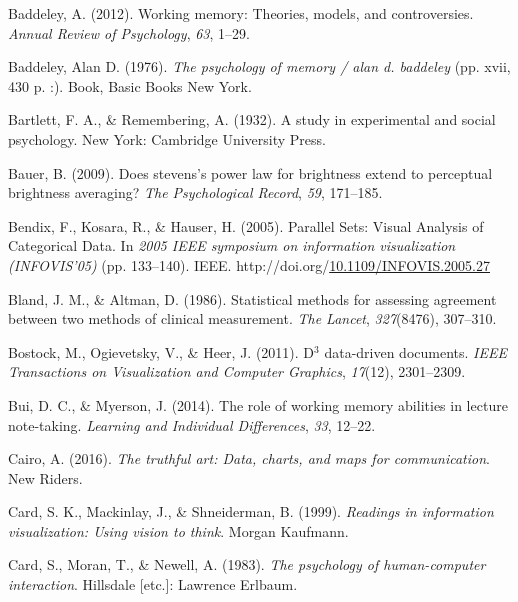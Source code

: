 \documentclass[print]{nuthesis}
\newlength{\cslhangindent}
\newenvironment{CSLReferences}[2]%
{\setlength{\parindent}{0pt}%
\everypar{\setlength{\hangindent}{\cslhangindent}}\ignorespaces}%
{\par}
\begin{document}
\begin{CSLReferences}{1}{0}
\leavevmode{}%
Baddeley, A. (2012). Working memory: Theories, models, and controversies. \emph{Annual Review of Psychology}, \emph{63}, 1--29.

\leavevmode{}%
Baddeley, Alan D. (1976). \emph{The psychology of memory / alan d. baddeley} (pp. xvii, 430 p. :). Book, Basic Books New York.

\leavevmode{}%
Bartlett, F. A., \& Remembering, A. (1932). A study in experimental and social psychology. New York: Cambridge University Press.

\leavevmode{}%
Bauer, B. (2009). Does stevens's power law for brightness extend to perceptual brightness averaging? \emph{The Psychological Record}, \emph{59}, 171--185.

\leavevmode{}%
Bendix, F., Kosara, R., \& Hauser, H. (2005). {Parallel Sets: Visual Analysis of Categorical Data}. In \emph{2005 IEEE symposium on information visualization (INFOVIS'05)} (pp. 133--140). IEEE. http://doi.org/\href{https://doi.org/10.1109/INFOVIS.2005.27}{10.1109/INFOVIS.2005.27}

\leavevmode{}%
Bland, J. M., \& Altman, D. (1986). Statistical methods for assessing agreement between two methods of clinical measurement. \emph{The Lancet}, \emph{327}(8476), 307--310.

\leavevmode{}%
Bostock, M., Ogievetsky, V., \& Heer, J. (2011). D\(^3\) data-driven documents. \emph{IEEE Transactions on Visualization and Computer Graphics}, \emph{17}(12), 2301--2309.

\leavevmode{}%
Bui, D. C., \& Myerson, J. (2014). The role of working memory abilities in lecture note-taking. \emph{Learning and Individual Differences}, \emph{33}, 12--22.

\leavevmode{}%
Cairo, A. (2016). \emph{The truthful art: Data, charts, and maps for communication}. New Riders.

\leavevmode{}%
Card, S. K., Mackinlay, J., \& Shneiderman, B. (1999). \emph{Readings in information visualization: Using vision to think}. Morgan Kaufmann.

\leavevmode{}%
Card, S., Moran, T., \& Newell, A. (1983). \emph{The psychology of human-computer interaction}. Hillsdale {[}etc.{]}: Lawrence Erlbaum.


\end{CSLReferences}
\end{document}
